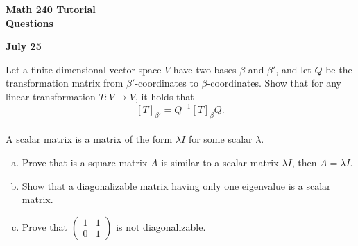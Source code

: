 \documentclass[a4paper,11pt]{article}
\begin{document}
\begin{center}
  {\Large\bfseries Math 240 Tutorial \\ Questions}
\end{center}
\begin{center}
  {\bfseries July 25}
\end{center}

 Let a finite dimensional vector space $V$ have two
bases $\beta$ and $\beta'$, and let $Q$ be the transformation matrix from
$\beta'$-coordinates to $\beta$-coordinates. Show that for any linear
transformation $T: V \rightarrow V$, it holds that
\[
  [T]_{\beta'} = Q^{-1}[T]_{\beta}Q.
\] \\

 A scalar matrix is a matrix of the form $\lambda
I$ for some scalar $\lambda$.
\begin{enumerate}[(a)]
\item Prove that is a square matrix $A$ is similar to a scalar matrix $\lambda
  I$, then $A=\lambda I$.
\item Show that a diagonalizable matrix having only one eigenvalue is a scalar
  matrix.
\item Prove that $\left( \begin{smallmatrix}1&1\\0&1\end{smallmatrix} \right)$
  is not diagonalizable. \\
\end{enumerate}
\end{document}
